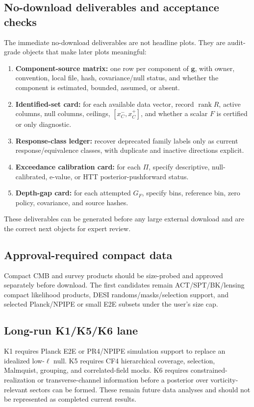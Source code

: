 \documentclass[11pt]{article}
\newcommand{\rank}{\operatorname{rank}}
\begin{document}
\subsection{No-download deliverables and acceptance checks}
The immediate no-download deliverables are not headline plots.  They are audit-grade objects that make later plots meaningful:
\begin{enumerate}
  \item \textbf{Component-source matrix:} one row per component of \(\bm g\), with owner, convention, local file, hash, covariance/null status, and whether the component is estimated, bounded, assumed, or absent.
  \item \textbf{Identified-set card:} for each available data vector, record \(\rank R\), active columns, null columns, ceilings, \([x_C^-,x_C^+]\), and whether a scalar \(F\) is certified or only diagnostic.
  \item \textbf{Response-class ledger:} recover deprecated family labels only as current response/equivalence classes, with duplicate and inactive directions explicit.
  \item \textbf{Exceedance calibration card:} for each \(\Pi\), specify descriptive, null-calibrated, e-value, or HTT posterior-pushforward status.
  \item \textbf{Depth-gap card:} for each attempted \(G_F\), specify bins, reference bin, zero policy, covariance, and source hashes.
\end{enumerate}
These deliverables can be generated before any large external download and are the correct next objects for expert review.

\subsection{Approval-required compact data}
Compact CMB and survey products should be size-probed and approved separately before download.  The first candidates remain ACT/SPT/BK/lensing compact likelihood products, DESI randoms/masks/selection support, and selected Planck/NPIPE or small E2E subsets under the user's size cap.

\subsection{Long-run K1/K5/K6 lane}
K1 requires Planck E2E or PR4/NPIPE simulation support to replace an idealized low-\(\ell\) null.  K5 requires CF4 hierarchical coverage, selection, Malmquist, grouping, and correlated-field mocks.  K6 requires constrained-realization or transverse-channel information before a posterior over vorticity-relevant sectors can be formed.  These remain future data analyses and should not be represented as completed current results.
\end{document}
